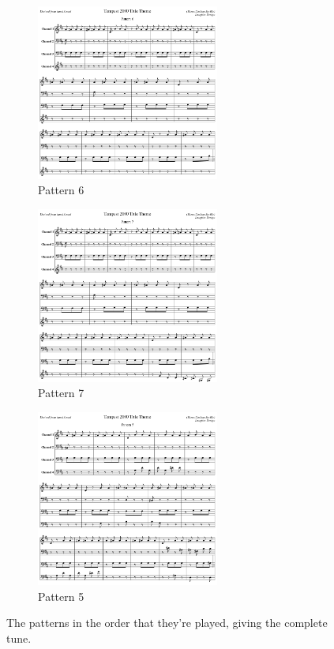 \begin{figure}[H]
{
    \begin{subfigure}{0.43\textwidth}
        \includegraphics[width=6cm]{src/titletune/sheet_music/title_no_6_page_1001.png}%
      \caption*{Pattern 6}
    \end{subfigure}
    \begin{subfigure}{0.43\textwidth}
        \includegraphics[width=6cm]{src/titletune/sheet_music/title_no_7_page_1001.png}%
      \caption*{Pattern 7}
    \end{subfigure}
    \begin{subfigure}{0.43\textwidth}
        \includegraphics[width=6cm]{src/titletune/sheet_music/title_no_5_page_1001.png}%
      \caption*{Pattern 5}
    \end{subfigure}
}\caption*{The patterns in the order that they're played, giving the complete tune.}
\end{figure}
